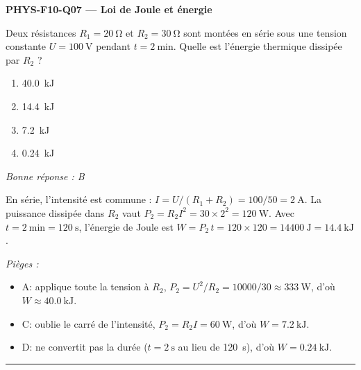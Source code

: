 \documentclass[11pt,a4paper]{article}
\begin{document}
\noindent\textbf{PHYS-F10-Q07 --- Loi de Joule et énergie}\par
Deux résistances $R_1 = \qty{20}{\ohm}$ et $R_2 = \qty{30}{\ohm}$ sont montées en série sous une tension constante $U = \qty{100}{\volt}$ pendant $t = \qty{2}{\minute}$. Quelle est l'énergie thermique dissipée par $R_2$ ?
\begin{enumerate}[label=\Alph*)]
\item \qty{40.0}{\kilo\joule}
\item \qty{14.4}{\kilo\joule}
\item \qty{7.2}{\kilo\joule}
\item \qty{0.24}{\kilo\joule}
\end{enumerate}
\textit{Bonne réponse : B}\par
En série, l'intensité est commune : $I = U/(R_1+R_2) = 100/50 = \qty{2}{\ampere}$. La puissance dissipée dans $R_2$ vaut $P_2 = R_2 I^2 = 30\times2^2 = \qty{120}{\watt}$. Avec $t = \qty{2}{\minute} = \qty{120}{\second}$, l'énergie de Joule est $W = P_2\,t = 120\times120 = \qty{14400}{\joule} = \qty{14.4}{\kilo\joule}$.\par
\textit{Pièges :}
\begin{itemize}
\item A: applique toute la tension à $R_2$, $P_2 = U^2/R_2 = 10000/30 \approx \qty{333}{\watt}$, d'où $W \approx \qty{40.0}{\kilo\joule}$.
\item C: oublie le carré de l'intensité, $P_2 = R_2 I = \qty{60}{\watt}$, d'où $W = \qty{7.2}{\kilo\joule}$.
\item D: ne convertit pas la durée ($t = \qty{2}{\second}$ au lieu de \qty{120}{\second}), d'où $W = \qty{0.24}{\kilo\joule}$.
\end{itemize}
\vspace{8pt}\hrule\vspace{8pt}
\end{document}
